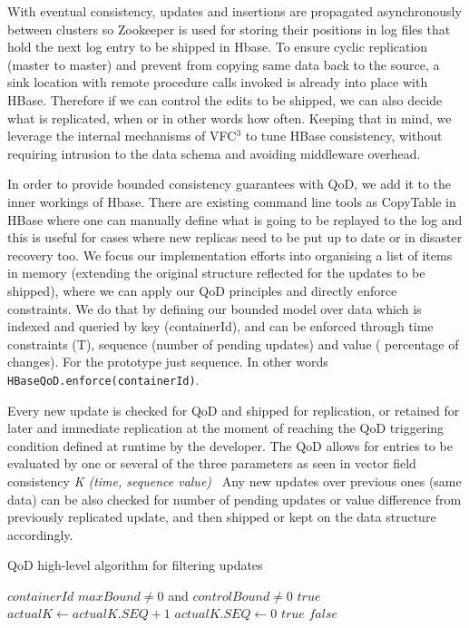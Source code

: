 With eventual consistency, updates and insertions are propagated asynchronously between clusters so Zookeeper is used for storing their positions in log files that hold the next log entry to be shipped in Hbase. To ensure cyclic replication (master to master) and prevent from copying same data back to the source, a sink location with remote procedure calls invoked is already into place with HBase. Therefore if we can control the edits to be shipped, we can also decide what is replicated, when or in other words how often. Keeping that in mind, we leverage the internal mechanisms of VFC$^{3}$ to tune HBase consistency, without requiring intrusion to the data schema and avoiding middleware overhead.

In order to provide bounded consistency guarantees with QoD, we add it to the inner workings of Hbase. There are existing command line tools as CopyTable in HBase where one can manually define what is going to be replayed to the log and this is useful for cases where new replicas need to be put up to date or in disaster recovery too. We focus our implementation efforts into organising a list of items in memory (extending the original structure reflected for the updates to be shipped), where we can apply our QoD principles and directly enforce constraints. We do that by defining our bounded model over data which is indexed and queried by key (containerId), and can be enforced through time constraints (T), sequence (number of pending updates) and value ( percentage of changes). For the prototype just sequence. In other words \texttt{HBaseQoD.enforce(containerId)}.

Every new update is checked for QoD and shipped for replication, or retained for later and immediate replication at the moment of reaching the QoD triggering condition defined at runtime by the developer. The QoD allows for entries to be evaluated by one or several of the three parameters as seen in vector field consistency \emph{K (time, sequence value)}~\cite{Santos:2007} Any new updates over previous ones (same data) can be also checked for number of pending updates or value difference from previously replicated update, and then shipped or kept on the data structure accordingly.

\begin{algorithm*}
\caption{QoD high-level algorithm for filtering updates}\label{algo1}
\label{alg1}
\begin{algorithmic}[1]
\REQUIRE $containerId$
\ENSURE $maxBound \neq 0$ and $controlBound \neq 0$
\RETURN $true$
\STATE $actualK \leftarrow actualK.SEQ+1$
	\STATE $actualK.SEQ \leftarrow 0$
	\RETURN $true$
	\ELSE
	\RETURN $false$
	\ENDIF
\ENDIF
\ENDWHILE
\end{algorithmic}
\end{algorithm*}